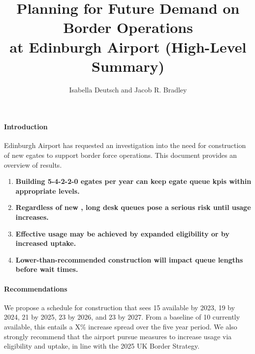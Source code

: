 \documentclass[10pt]{article}
\title{Planning for Future Demand on Border Operations\\ at Edinburgh Airport (High-Level Summary)}
\author{Isabella Deutsch and Jacob R. Bradley}
\date{}
\begin{document}
\maketitle
\thispagestyle{empty}

\vspace{-15pt}
\paragraph{Introduction}
Edinburgh Airport has requested an investigation into the need for construction of new \glspl{egate} to support border force operations. This document provides an overview of results.
\begin{tcolorbox}[
colframe=edi-dark-purple,
colback=edi-light-purple,
fonttitle=\bfseries,
title = {Report Highlights}]
\begin{enumerate}[itemsep=-1ex]
   \vspace{-1.5mm}
    \item \textbf{Building 5-4-2-2-0 \glspl{egate} per year can keep \gls{egate} queue \glspl{kpi} within appropriate levels.}\\
    \vspace{-1.5mm}
    \item \textbf{Regardless of new , long desk queues pose a serious risk until  usage increases.}\\
    \vspace{-1.5mm}
    \item \textbf{Effective  usage may be achieved by expanded eligibility or by increased uptake.}\\
    \vspace{-1.5mm}
    \item \textbf{Lower-than-recommended  construction will impact queue lengths before wait times.}
    \vspace{-1.5mm}
\end{enumerate}
\end{tcolorbox}
\paragraph{Recommendations}
We propose a schedule for  construction that sees 15  available by 2023, 19 by 2024, 21 by 2025, 23 by 2026, and 23 by 2027. From a baseline of 10  currently available, this entails a X\% increase spread over the five year period. We also strongly recommend that the airport pursue measures to increase  usage via eligibility and uptake, in line with the 2025 UK Border Strategy. 
\end{document}
